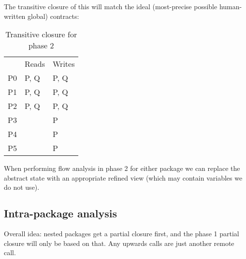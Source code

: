 \documentclass{article}
\begin{document}
\noindent
The transitive closure of this will match the ideal (most-precise possible
human-written global) contracts:

\begin{table}[h]
  \begin{center}
    \begin{tabular}{lll}
         & Reads & Writes \\
      P0 & P, Q  & P, Q   \\
      P1 & P, Q  & P, Q   \\
      P2 & P, Q  & P, Q   \\
      P3 &       & P      \\
      P4 &       & P      \\
      P5 &       & P      \\
    \end{tabular}
  \end{center}
  \caption{Transitive closure for phase 2}
\end{table}

\noindent
When performing flow analysis in phase 2 for either package we can replace
the abstract state with an appropriate refined view (which may contain
variables we do not use).

\newpage
\subsection{Intra-package analysis}
Overall idea: nested packages get a partial closure first, and the phase 1
partial closure will only be based on that. Any upwards calls are just
another remote call.
\end{document}
